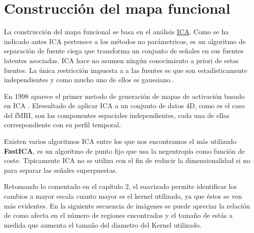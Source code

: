 \section{Construcción del mapa funcional}

La construcción del mapa funcional se basa en el análisis \hyperref[glos:ica]{ICA}. Como se ha indicado antes ICA pertenece a los métodos no parámetricos, es un algoritmo de separación de fuente ciega que transforma un conjunto de señales en sus fuentes latentes asociadas. ICA hace no asumen ningún conocimiento a priori de estas fuentes. La única restricción impuesta a a las fuentes es que son estadísticamente independientes y como mucho uno de ellos es gaussiano.\cite{ica}.

En 1998 aparece el primer metodo de generación de mapas de activación basado en ICA \cite{fmriica}. Elresultado de aplicar ICA a un conjunto de datos 4D, como es el caso del fMRI, son las componentes espaciales independientes, cada una de ellas correspondiente con su perfil temporal.


Existen varios algoritmos ICA entre los que nos encontramos el más utilizado \textbf{FastICA}, es un algoritmo de punto fijo que usa la negentropía como función de coste. Tipicamente ICA no se utiliza con el fin de reducir la dimensionalidad si no para separar las señales superpuestas.

Retomando lo comentado en el capítulo 2, el suavizado permite identificar los cambios a mayor escala cuanto mayor es el kernel utilizado, ya que éstos se ven más evidentes. En la siguiente secuencia de imágenes se puede apreciar la relación de como afecta en el número de regiones encontradas y el tamaño de estás a medida que aumenta el tamaño del diametro del Kernel utilizado.


